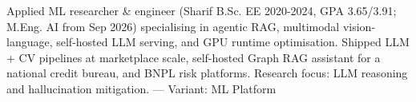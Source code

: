\small{Applied ML researcher \& engineer (Sharif B.Sc. EE 2020-2024, GPA 3.65/3.91; M.Eng. AI from Sep 2026) specialising in agentic RAG, multimodal vision-language, self-hosted LLM serving, and GPU runtime optimisation. Shipped LLM + CV pipelines at marketplace scale, self-hosted Graph RAG assistant for a national credit bureau, and BNPL risk platforms. Research focus: LLM reasoning and hallucination mitigation.
 — Variant: ML Platform}
